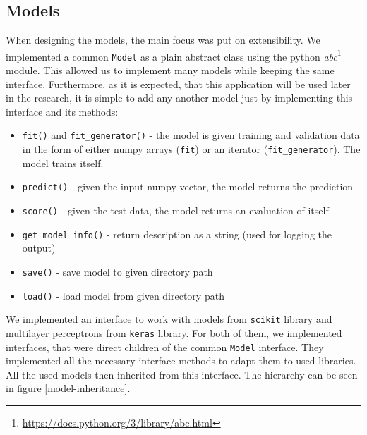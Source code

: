 \subsection*{Models}

When designing the models, the main focus was put on extensibility. We implemented a common \texttt{Model} as a plain abstract class using the python \textit{abc}\footnote{\url{https://docs.python.org/3/library/abc.html}} module. This allowed us to implement many models while keeping the same interface. Furthermore, as it is expected, that this application will be used later in the research, it is simple to add any another model just by implementing this interface and its methods:

\begin{itemize}

\item \texttt{fit()} and \texttt{fit\_generator()} - the model is given training and validation data in the form of either numpy arrays (\texttt{fit}) or an iterator (\texttt{fit\_generator}). The model trains itself.

\item \texttt{predict()} - given the input numpy vector, the model returns the prediction

\item \texttt{score()} - given the test data, the model returns an evaluation of itself

\item \texttt{get\_model\_info()} - return description as a string (used for logging the output)

\item \texttt{save()} - save model to given directory path

\item \texttt{load()} - load model from given directory path

\end{itemize} 

We implemented an interface to work with models from \texttt{scikit} library and multilayer perceptrons from \texttt{keras} library. For both of them, we implemented interfaces, that were direct children of the common \texttt{Model} interface. They implemented all the necessary interface methods to adapt them to used libraries. All the used models then inherited from this interface. The hierarchy can be seen in figure \ref{model-inheritance}.


